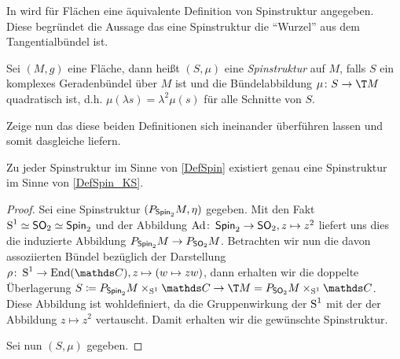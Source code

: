 In \cite{KS96} wird für Flächen eine äquivalente Definition
von Spinstruktur angegeben. Diese begründet die Aussage das
eine Spinstruktur die \enquote{Wurzel} aus dem Tangentialbündel ist.

\begin{Def}\label{DefSpin_KS}
	Sei $ (M,g) $ eine Fläche, dann heißt $ (S,\mu) $ eine
	\textit{Spinstruktur} auf $ M $, falls $ S $ ein komplexes Geradenbündel
	über $ M $ ist und die Bündelabbildung $ \abb{\mu}{S}{\T M} $ quadratisch	ist, d.h. $ \mu(\lambda s) = \lambda^2 \mu(s) $ für alle Schnitte
	von $ S $.
\end{Def}

Zeige nun das diese beiden Definitionen sich ineinander überführen
lassen und somit dasgleiche liefern.

\begin{Satz}
	Zu jeder Spinstruktur im Sinne von \cref{DefSpin} existiert
	genau eine Spinstruktur im Sinne von \cref{DefSpin_KS}.
	\begin{proof}
		Sei eine Spinstruktur $ (\Ph{\spin_2}{M},\eta) $ gegeben.
		Mit den Fakt $ \S^1\simeq\so_2\simeq\spin_2 $ und der Abbildung
		$ \abb{\Ad}{\spin_2}{\so_2},z\mapsto z^2 $ liefert uns dies
		die induzierte Abbildung $ \Ph{\spin_2}{M}\rightarrow \Ph{\so_2}{M} $. Betrachten wir nun die davon assoziierten
		Bündel bezüglich der Darstellung $ \abb{\rho}{\S^1}{\End(\c)}, z\mapsto (w \mapsto zw) $, dann erhalten wir die doppelte
		Überlagerung $ S\coloneqq \Ph{\spin_2}{M}\times_{\S^1}\c \rightarrow {\T M = \Ph{\so_2}{M}\times_{\S^1}\c} $. Diese Abbildung ist wohldefiniert, da die Gruppenwirkung der $ \S^1 $ mit der
	    der Abbildung $ z\mapsto z^2 $ vertauscht. Damit erhalten
	    wir die gewünschte Spinstruktur.
	    
	    Sei nun $ (S,\mu) $ gegeben. 
	    
		
	\end{proof}
\end{Satz}



